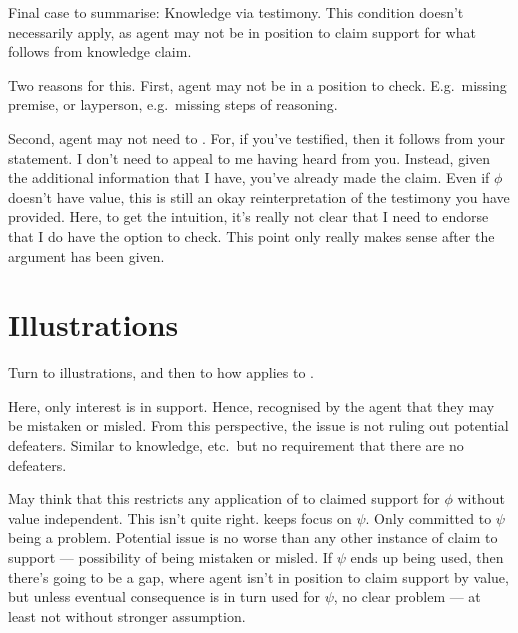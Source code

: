 \begin{note}
  Final case to summarise:
  Knowledge via testimony.
  This condition doesn't necessarily apply, as agent may not be in position to claim support for what follows from knowledge claim.

  Two reasons for this.
  First, agent may not be in a position to check.
  E.g.\ missing premise, or layperson, e.g.\ missing steps of reasoning.

  Second, agent may not need to .
  For, if you've testified, then it follows from your statement.
  I don't need to appeal to me having heard from you.
  Instead, given the additional information that I have, you've already made the claim.
  Even if \(\phi\) doesn't have value, this is still an okay reinterpretation of the testimony you have provided.
  Here, to get the intuition, it's really not clear that I need to endorse that I do have the option to check.
  {
    \color{red}
    This point only really makes sense after the argument has been given.
  }
\end{note}


\section{Illustrations}
\label{sec:illustrations-ni}

\begin{note}
  Turn to illustrations, and then to how \nI{} applies to \gsi{}.
\end{note}

\begin{note}
  Here, only interest is in support.
  Hence, recognised by the agent that they may be mistaken or misled.
  From this perspective, the issue is not ruling out potential defeaters.
  Similar to knowledge, etc.\ but no requirement that there are no defeaters.
\end{note}

\begin{note}
  May think that this restricts any application of \RBV{} to claimed support for \(\phi\) without value independent.
  This isn't quite right.
  \eiS{} keeps focus on \(\psi\).
  Only committed to \(\psi\) being a problem.
  Potential issue is no worse than any other instance of claim to support --- possibility of being mistaken or misled.
  If \(\psi\) ends up being used, then there's going to be a gap, where agent isn't in position to claim support by value, but unless eventual consequence is in turn used for \(\psi\), no clear problem --- at least not without stronger assumption.
\end{note}

